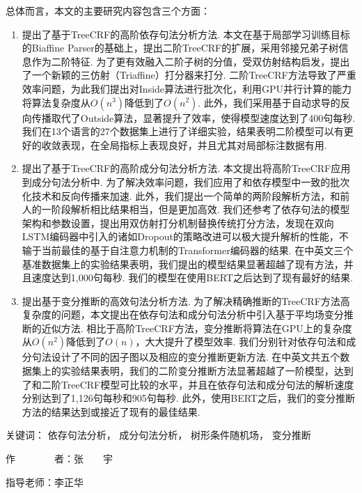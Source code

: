 \begin{cabstract}
  总体而言，本文的主要研究内容包含三个方面：
  \begin{enumerate}
    \item 提出了基于TreeCRF的高阶依存句法分析方法.
          本文在基于局部学习训练目标的Biaffine Parser的基础上，提出二阶TreeCRF的扩展，采用邻接兄弟子树信息作为二阶特征.
          为了更有效融入二阶子树的分值，受双仿射结构启发，提出了一个新颖的三仿射（Triaffine）打分器来打分.
          二阶TreeCRF方法导致了严重效率问题，为此我们提出对Inside算法进行批次化，利用GPU并行计算的能力将算法复杂度从$O(n^3)$降低到了$O(n^2)$.
          此外，我们采用基于自动求导的反向传播取代了Outside算法，显著提升了效率，使得模型速度达到了400句每秒.
          我们在13个语言的27个数据集上进行了详细实验，结果表明二阶模型可以有更好的收敛表现，在全局指标上表现良好，并且尤其对局部标注数据有用.
    \item 提出了基于TreeCRF的高阶成分句法分析方法.
          本文提出将高阶TreeCRF应用到成分句法分析中.
          为了解决效率问题，我们应用了和依存模型中一致的批次化技术和反向传播来加速.
          此外，我们提出一个简单的两阶段解析方法，和前人的一阶段解析相比结果相当，但是更加高效.
          我们还参考了依存句法的模型架构和参数设置，提出用双仿射打分机制替换传统打分方法，发现在双向LSTM编码器中引入的诸如Dropout的策略改进可以极大提升解析的性能，不输于当前最佳的基于自注意力机制的Transformer编码器的结果.
          在中英文三个基准数据集上的实验结果表明，我们提出的模型结果显著超越了现有方法，并且速度达到1,000句每秒.
          我们的模型在使用BERT之后达到了现有最好的结果.
    \item 提出基于变分推断的高效句法分析方法.
          为了解决精确推断的TreeCRF方法高复杂度的问题，本文提出在依存句法和成分句法分析中引入基于平均场变分推断的近似方法.
          相比于高阶TreeCRF方法，变分推断将算法在GPU上的复杂度从$O(n^2)$降低到了$O(n)$，大大提升了模型效率.
          我们分别针对依存句法和成分句法设计了不同的因子图以及相应的变分推断更新方法.
          在中英文共五个数据集上的实验结果表明，我们的二阶变分推断方法显著超越了一阶模型，达到了和二阶TreeCRF模型可比较的水平，并且在依存句法和成分句法的解析速度分别达到了1,126句每秒和905句每秒.
          此外，使用BERT之后，我们的变分推断方法的结果达到或接近了现有的最佳结果.
  \end{enumerate}



  \vskip 21bp
    {\heiti{} 关键词：}
  依存句法分析，
  成分句法分析，
  树形条件随机场，
  变分推断

  \begin{flushright}
    作~~~~~~~~者：张~~~~宇

    指导老师：李正华

  \end{flushright}
\end{cabstract}


